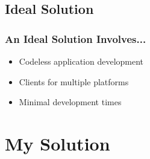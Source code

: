\documentclass[]{beamer}
\begin{document}
\subsection{Ideal Solution}

\begin{frame}
\frametitle{An Ideal Solution Involves...}
\begin{itemize}
  \item Codeless application development
  \item Clients for multiple platforms
  \item Minimal development times
\end{itemize}

\note{

}
\end{frame}


\section{My Solution}
\end{document}
